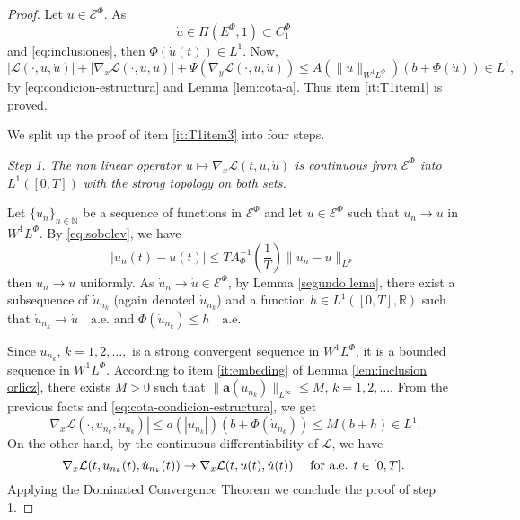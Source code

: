 \documentclass[twoside]{article}
\theoremstyle{remark}
\newcommand{\orlnor}{\|_{L^{\Phi}}}
\newcommand{\lphi}{L^{\Phi}}
\newcommand{\ephi}{E^{\Phi}}
\newcommand{\claseor}{C^{\Phi}}
\newcommand{\wphi}{W^{1}\lphi}
\newcommand{\sobnor}{\|_{W^{1}\lphi}}
\newcommand{\domi}{\mathcal{E}^{\Phi}}
\renewcommand{\b}[1]{\boldsymbol{#1}}
\newcommand{\rr}{\mathbb{R}}
\renewcommand{\leq}{\leqslant}
\begin{document}
\begin{proof}
Let $u\in \domi$.
As 
\begin{equation}\label{eq:inclusion3}
\dot{u}\in\Pi(\ephi,1)\subset \claseor_1
\end{equation}
and \eqref{eq:inclusiones}, then $\Phi( \dot{u}(t)) \in L^1$.
Now,
 \begin{equation}\label{eq:cota-condicion-estructura}
|\mathcal{L}(\cdot,u,\dot{u})|+ |\nabla_x\mathcal{L}(\cdot,u,\dot{u})|
+\Psi(\nabla_y\mathcal{L}(\cdot,u,\dot{u}))
\leq A(\|u\sobnor ) (b+ \Phi (\dot{u})) \in
 L^1,
\end{equation}
by  \eqref{eq:condicion-estructura} and Lemma \ref{lem:cota-a}.
Thus item \eqref{it:T1item1} is proved.

We split up the proof of item \ref{it:T1item3} into four steps.

\noindent\emph{Step 1. The non linear operator  $u \mapsto \nabla_x\mathcal{L}(t,u,\dot{u})$ is continuous from $\domi$ into $L^{1}([0,T])$ with the strong topology on both sets.} 




Let   $\{u_n\}_{n\in \mathbb{N}}$ be a sequence of  functions in $\domi$  
and let $u\in \domi$  such that $u_n\rightarrow u$ in $\wphi$.
By \eqref{eq:sobolev}, we have 
\[
|u_n(t)-u(t)|\leq T A_{\Phi}^{-1}\left(\frac{1}{T}\right) \|u_n-u\orlnor
\]
then $u_n \to u$ uniformly.
As $\dot{u}_n\rightarrow \dot{u}\in\domi$, by 
  Lemma \ref{segundo lema}, there exist a subsequence of  $\dot{u}_{n_k}$ (again denoted $\dot{u}_{n_k}$) and a function  
	$h\in L^1([0,T],\rr)$
	such that  $\dot{u}_{n_k}\rightarrow \dot{u} \quad\text{a.e.}$ and $\Phi(\dot{u}_{n_k})\leq h\quad\text{a.e}$.  

Since $u_{n_k}$, $k=1,2,\ldots,$ is a strong convergent sequence in $\wphi$, it is a bounded sequence in $\wphi$. 
According to item \eqref{it:embeding} of   Lemma \ref{lem:inclusion orlicz}, 
there exists $M>0$ such that $\|\b{a}(u_{n_k})\|_{L^{\infty}} \leq M$, $k=1,2,\ldots$.  
From the previous facts and \eqref{eq:cota-condicion-estructura}, we get
\begin{equation*}\label{eq:DxL1-bis}
|\nabla_x\mathcal{L}(\cdot,u_{n_k},\dot{u}_{n_k})|\leq a(|u_{n_k}|)(b+\Phi(\dot{u}_{n_k}))\leq
M (b+h) \in L^1.
\end{equation*}
On the other hand, by the continuous differentiability of $\mathcal{L}$, we have
\[\nabla_x\mathcal{L}(t,u_{n_k}(t),\dot{u}_{n_k}(t))\to \nabla_x\mathcal{L}(t,u(t),\dot{u}(t))\quad\hbox{ for a.e. } t\in[0,T].\]
Applying the Dominated Convergence Theorem we conclude the proof of step 1.



\end{proof}
\end{document}
